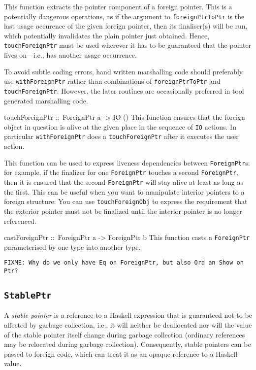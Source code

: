 \documentclass[a4paper,twosides]{article}
\makeatletter
\newcommand{\code}[1]{\texttt{#1}}      %
\newenvironment{codedesc}{%
  \list{}{\labelwidth\z@
    \let\makelabel\codedesclabel}
  }{%
  \endlist
  }
\newcommand*{\codedesclabel}[1]{%
  \hspace{-\leftmargin}
  \parbox[b]{\labelwidth}{\makebox[0pt][l]{\code{#1}}\\}\hfil\relax
  }
\makeatother
\begin{document}
\begin{codedesc}
  This function extracts the pointer component of a foreign pointer. This is a
  potentially dangerous operations, as if the argument to
  \code{foreignPtrToPtr} is the last usage occurence of the given foreign
  pointer, then its finaliser(s) will be run, which potentially invalidates
  the plain pointer just obtained.  Hence, \code{touchForeignPtr} must be used
  wherever it has to be guaranteed that the pointer lives on---i.e., has
  another usage occurrence.
  
  To avoid subtle coding errors, hand written marshalling code should
  preferably use \code{withForeignPtr} rather than combinations of
  \code{foreignPtrToPtr} and \code{touchForeignPtr}. However, the later
  routines are occasionally preferred in tool generated marshalling code.
  
\item[touchForeignPtr ::\ ForeignPtr a -> IO ()] This function ensures that
  the foreign object in question is alive at the given place in the sequence
  of \code{IO} actions. In particular \code{withForeignPtr} does a
  \code{touchForeignPtr} after it executes the user action.
  
  This function can be used to express liveness dependencies between
  \code{ForeignPtr}s: for example, if the finalizer for one \code{ForeignPtr}
  touches a second \code{ForeignPtr}, then it is ensured that the second
  \code{ForeignPtr} will stay alive at least as long as the first. This can be
  useful when you want to manipulate interior pointers to a foreign structure:
  You can use \code{touchForeignObj} to express the requirement that the
  exterior pointer must not be finalized until the interior pointer is no
  longer referenced.
    
\item[castForeignPtr ::\ ForeignPtr a -> ForeignPtr b] This function casts a
  \code{ForeignPtr} parameterised by one type into another type.
\end{codedesc}

\begin{verbatim}
FIXME: Why do we only have Eq on ForeignPtr, but also Ord an Show on Ptr?
\end{verbatim}

\subsection{\code{StablePtr}}
\label{sec:StablePtr}

A \emph{stable pointer} is a reference to a Haskell expression that is
guaranteed not to be affected by garbage collection, i.e., it will neither be
deallocated nor will the value of the stable pointer itself change during
garbage collection (ordinary references may be relocated during garbage
collection).  Consequently, stable pointers can be passed to foreign code,
which can treat it as an opaque reference to a Haskell value.
\end{document}
